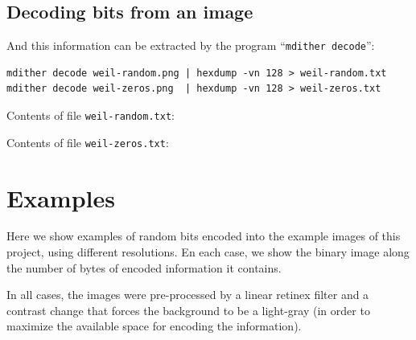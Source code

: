 \subsection{Decoding bits from an image}

And this information can be extracted by the program ``\verb+mdither decode+'':
\begin{verbatim}
mdither decode weil-random.png | hexdump -vn 128 > weil-random.txt
mdither decode weil-zeros.png  | hexdump -vn 128 > weil-zeros.txt
\end{verbatim}

Contents of file \verb+weil-random.txt+:

Contents of file \verb+weil-zeros.txt+:


\section{Examples}

Here we show examples of random bits encoded into the example images of this
project, using different resolutions.
En each case, we show the binary image along the number of bytes of encoded
information it contains.

In all cases, the images were pre-processed by a linear retinex filter and a
contrast change that forces the background to be a light-gray (in order to
maximize the available space for encoding the information).




